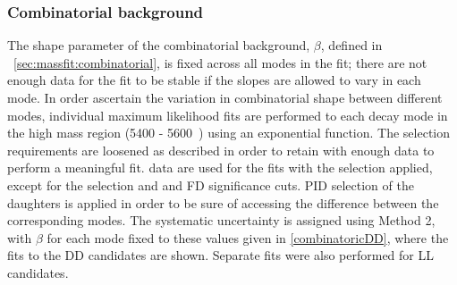 \subsubsection{Combinatorial background}

The shape parameter of the combinatorial background, $\beta$, defined in \sect~\ref{sec:massfit:combinatorial}, is fixed across all \Dz modes in the \CP fit; there are not enough data for the fit to be stable if the slopes are allowed to vary in each mode. In order ascertain the variation in combinatorial shape between different \Dz modes, individual maximum likelihood fits are performed to each \Dz decay mode in the high \Bm mass region (5400 - 5600~\mevcc) using an exponential function. The selection requirements are loosened as described in order to retain with enough data to perform a meaningful fit. \runone data are used for the fits with the selection applied, except for the \Kstarm selection and \Dz and \KS FD significance cuts. PID selection of the \Dz daughters is applied in order to be sure of accessing the difference between the corresponding \Dz modes. The systematic uncertainty is assigned using Method 2, with $\beta$ for each \Dz mode fixed to these values given in \fig\ref{combinatoricDD}, where the fits to the DD candidates are shown. Separate fits were also performed for LL candidates.


